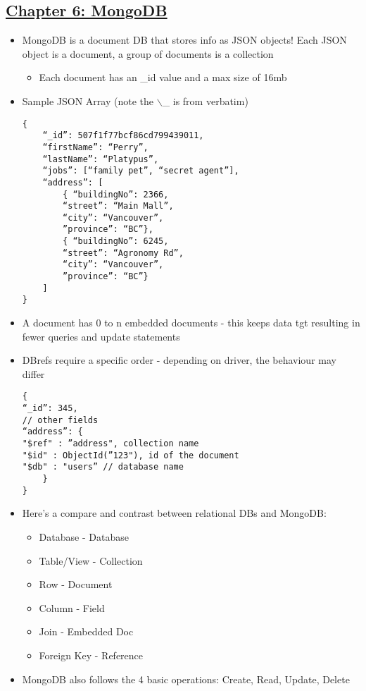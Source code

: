\documentclass[8pt,landscape,a4paper, fleqn, dvipsnames]{extarticle}
\begin{document}
\begin{multicols*}{4}
\section*{\ul{Chapter 6: MongoDB}}
\begin{itemize}
    \item MongoDB is a document DB that stores info as JSON objects! Each JSON object is a document, a group of documents is a collection
    \begin{itemize}
        \item Each document has an \_id value and a max size of 16mb
    \end{itemize}
    \item Sample JSON Array (note the $\backslash$\_ is from verbatim)
    \begin{verbatim}
{
    “_id”: 507f1f77bcf86cd799439011,
    “firstName”: “Perry”,
    “lastName”: “Platypus”,
    “jobs”: [“family pet”, “secret agent”],
    “address”: [
        { “buildingNo”: 2366, 
        “street”: “Main Mall”, 
        “city”: “Vancouver”,      
        ”province”: “BC”},
        { “buildingNo”: 6245, 
        “street”: “Agronomy Rd”, 
        “city”: “Vancouver”,
        ”province”: “BC”}
    ]
}             
    \end{verbatim}  
    \item A document has 0 to n embedded documents - this keeps data tgt resulting in fewer queries and update statements
    \item DBrefs require a specific order - depending on driver, the behaviour may differ
    \begin{verbatim}
{
“_id”: 345,
// other fields
“address”: {
"$ref" : ”address", collection name
"$id" : ObjectId(”123"), id of the document
"$db" : "users” // database name
    }
}            
    \end{verbatim}
    \item Here's a compare and contrast between relational DBs and MongoDB:
    \begin{itemize}
        \item Database - Database
        \item Table/View - Collection
        \item Row - Document
        \item Column - Field
        \item Join - Embedded Doc
        \item Foreign Key - Reference
    \end{itemize}
    \item MongoDB also follows the 4 basic operations: Create, Read, Update, Delete

\end{itemize}
\end{multicols*}
\end{document}
